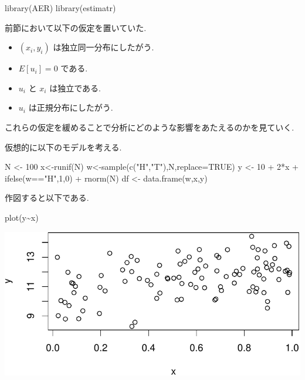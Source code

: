 \documentclass[
  letterpaper,
  xelatex,
  ja=standard, xelatex]{bxjsbook}
\newenvironment{Shaded}{\begin{snugshade}}{\end{snugshade}}
\newcommand{\AttributeTok}[1]{\textcolor[rgb]{0.40,0.45,0.13}{#1}}
\newcommand{\ConstantTok}[1]{\textcolor[rgb]{0.56,0.35,0.01}{#1}}
\newcommand{\DecValTok}[1]{\textcolor[rgb]{0.68,0.00,0.00}{#1}}
\newcommand{\FunctionTok}[1]{\textcolor[rgb]{0.28,0.35,0.67}{#1}}
\newcommand{\NormalTok}[1]{\textcolor[rgb]{0.00,0.23,0.31}{#1}}
\newcommand{\OtherTok}[1]{\textcolor[rgb]{0.00,0.23,0.31}{#1}}
\newcommand{\SpecialCharTok}[1]{\textcolor[rgb]{0.37,0.37,0.37}{#1}}
\newcommand{\StringTok}[1]{\textcolor[rgb]{0.13,0.47,0.30}{#1}}
\providecommand{\tightlist}{%
  \setlength{\itemsep}{0pt}\setlength{\parskip}{0pt}}\usepackage{longtable,booktabs,array}
\begin{document}
\begin{Shaded}
\begin{Highlighting}[]
\FunctionTok{library}\NormalTok{(AER)}
\FunctionTok{library}\NormalTok{(estimatr)}
\end{Highlighting}
\end{Shaded}

前節において以下の仮定を置いていた.

\begin{itemize}
\tightlist
\item
  \((x_i,y_i)\) は独立同一分布にしたがう.
\item
  \(E[u_i]=0\) である.
\item
  \(u_i\) と \(x_i\) は独立である.
\item
  \(u_i\) は正規分布にしたがう.
\end{itemize}

これらの仮定を緩めることで分析にどのような影響をあたえるのかを見ていく.

仮想的に以下のモデルを考える.

\begin{Shaded}
\begin{Highlighting}[]
\NormalTok{N }\OtherTok{\textless{}{-}} \DecValTok{100}
\NormalTok{x}\OtherTok{\textless{}{-}}\FunctionTok{runif}\NormalTok{(N)}
\NormalTok{w}\OtherTok{\textless{}{-}}\FunctionTok{sample}\NormalTok{(}\FunctionTok{c}\NormalTok{(}\StringTok{"H"}\NormalTok{,}\StringTok{"T"}\NormalTok{),N,}\AttributeTok{replace=}\ConstantTok{TRUE}\NormalTok{)}
\NormalTok{y }\OtherTok{\textless{}{-}} \DecValTok{10} \SpecialCharTok{+} \DecValTok{2}\SpecialCharTok{*}\NormalTok{x }\SpecialCharTok{+} \FunctionTok{ifelse}\NormalTok{(w}\SpecialCharTok{==}\StringTok{"H"}\NormalTok{,}\DecValTok{1}\NormalTok{,}\DecValTok{0}\NormalTok{) }\SpecialCharTok{+} \FunctionTok{rnorm}\NormalTok{(N)}
\NormalTok{df }\OtherTok{\textless{}{-}} \FunctionTok{data.frame}\NormalTok{(w,x,y)}
\end{Highlighting}
\end{Shaded}

作図すると以下である.

\begin{Shaded}
\begin{Highlighting}[]
\FunctionTok{plot}\NormalTok{(y}\SpecialCharTok{\textasciitilde{}}\NormalTok{x)}
\end{Highlighting}
\end{Shaded}

\includegraphics{08-regression2_files/figure-pdf/unnamed-chunk-3-1.pdf}
\end{document}
